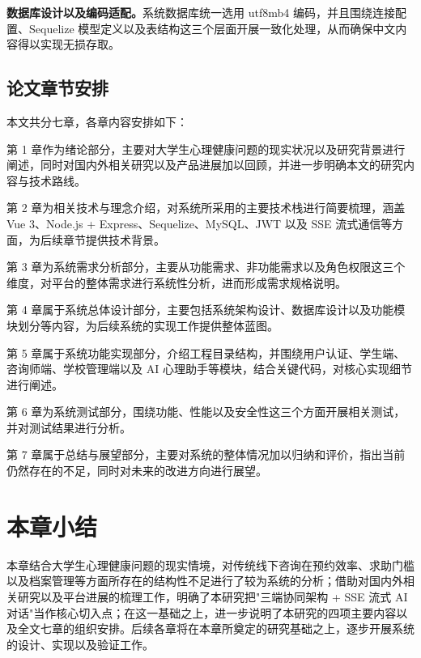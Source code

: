 \textbf{数据库设计以及编码适配。}系统数据库统一选用 utf8mb4 编码，并且围绕连接配置、Sequelize 模型定义以及表结构这三个层面开展一致化处理，从而确保中文内容得以实现无损存取。

\subsection{论文章节安排}

本文共分七章，各章内容安排如下：

第 1 章作为绪论部分，主要对大学生心理健康问题的现实状况以及研究背景进行阐述，同时对国内外相关研究以及产品进展加以回顾，并进一步明确本文的研究内容与技术路线。

第 2 章为相关技术与理念介绍，对系统所采用的主要技术栈进行简要梳理，涵盖 Vue 3、Node.js + Express、Sequelize、MySQL、JWT 以及 SSE 流式通信等方面，为后续章节提供技术背景。

第 3 章为系统需求分析部分，主要从功能需求、非功能需求以及角色权限这三个维度，对平台的整体需求进行系统性分析，进而形成需求规格说明。

第 4 章属于系统总体设计部分，主要包括系统架构设计、数据库设计以及功能模块划分等内容，为后续系统的实现工作提供整体蓝图。

第 5 章属于系统功能实现部分，介绍工程目录结构，并围绕用户认证、学生端、咨询师端、学校管理端以及 AI 心理助手等模块，结合关键代码，对核心实现细节进行阐述。

第 6 章为系统测试部分，围绕功能、性能以及安全性这三个方面开展相关测试，并对测试结果进行分析。

第 7 章属于总结与展望部分，主要对系统的整体情况加以归纳和评价，指出当前仍然存在的不足，同时对未来的改进方向进行展望。


\section*{本章小结}

本章结合大学生心理健康问题的现实情境，对传统线下咨询在预约效率、求助门槛以及档案管理等方面所存在的结构性不足进行了较为系统的分析；借助对国内外相关研究以及平台进展的梳理工作，明确了本研究把"三端协同架构 + SSE 流式 AI 对话"当作核心切入点；在这一基础之上，进一步说明了本研究的四项主要内容以及全文七章的组织安排。后续各章将在本章所奠定的研究基础之上，逐步开展系统的设计、实现以及验证工作。
